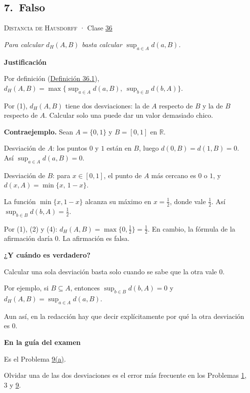 \documentclass[11pt,a4paper]{article}
\newcommand{\R}{\mathbb{R}}\newcommand{\N}{\mathbb{N}}\newcommand{\Q}{\mathbb{Q}}
\newcommand{\bloque}[1]{\par\smallskip\noindent\textbf{\color{acento}#1}\par}
\begin{document}
\subsection*{\hypertarget{r-7}{}7.\ \textcolor{bad}{Falso}}
{\small \textsc{Distancia de Hausdorff} · Clase \href{https://decostruttivismo.github.io/MAT2514-repaso/pdf/MAT2514_apuntes_completos.pdf\#nameddest=section.36}{36}}\par
\emph{Para calcular $d_H(A,B)$ basta calcular $\sup_{a\in A}d(a,B)$.}
\bloque{Justificación}
\begin{pasos}
\item[(1)] Por definición (\href{https://decostruttivismo.github.io/MAT2514-repaso/pdf/MAT2514_apuntes_completos.pdf\#nameddest=teorema.36.1}{Definición 36.1}), $d_H(A,B)=\max\bigl\{\sup_{a\in A}d(a,B),\ \sup_{b\in B}d(b,A)\bigr\}$.
\item[] Por (1), $d_H(A,B)$ tiene dos desviaciones: la de $A$ respecto de $B$ y la de $B$ respecto de $A$. Calcular solo una puede dar un valor demasiado chico.
\item[] \textbf{Contraejemplo.} Sean $A=\{0,1\}$ y $B=[0,1]$ en $\R$.
\item[(2)] Desviación de $A$: los puntos $0$ y $1$ están en $B$, luego $d(0,B)=d(1,B)=0$. Así $\sup_{a\in A}d(a,B)=0$.
\item[(3)] Desviación de $B$: para $x\in[0,1]$, el punto de $A$ más cercano es $0$ o $1$, y $d(x,A)=\min\{x,\,1-x\}$.
\item[(4)] La función $\min\{x,1-x\}$ alcanza su máximo en $x=\frac12$, donde vale $\frac12$. Así $\sup_{b\in B}d(b,A)=\frac12$.
\item[] Por (1), (2) y (4): $d_H(A,B)=\max\{0,\frac12\}=\frac12$. En cambio, la fórmula de la afirmación daría $0$. La afirmación es falsa.
\end{pasos}
\bloque{¿Y cuándo es verdadero?}
\begin{pasos}
\item[] Calcular una sola desviación basta solo cuando se sabe que la otra vale $0$.
\item[] Por ejemplo, si $B\subseteq A$, entonces $\sup_{b\in B}d(b,A)=0$ y $d_H(A,B)=\sup_{a\in A}d(a,B)$.
\item[] Aun así, en la redacción hay que decir explícitamente por qué la otra desviación es $0$.
\end{pasos}
\bloque{En la guía del examen}
\begin{pasos}
\item[] Es el Problema \hyperlink{prob-9}{9(a)}.
\item[] Olvidar una de las dos desviaciones es el error más frecuente en los Problemas \hyperlink{prob-1}{1}, 3 y \hyperlink{prob-9}{9}.
\end{pasos}
\end{document}
